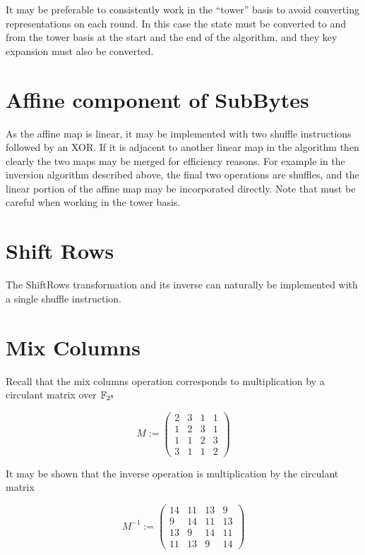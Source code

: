 \documentclass[a4paper]{article}
\numberwithin{equation}{section}
\begin{document}
It may be preferable to consistently work in the ``tower'' basis to avoid converting representations on each round. In this case the state must be converted to and from the tower basis at the start and the end of the algorithm, and they key expansion must also be converted.

\section{Affine component of SubBytes}

As the affine map is linear, it may be implemented with two shuffle instructions followed by an XOR. If it is adjacent to another linear map in the algorithm then clearly the two maps may be merged for efficiency reasons. For example in the inversion algorithm described above, the final two operations are shuffles, and the linear portion of the affine map may be incorporated directly. Note that must be careful when working in the tower basis.

\section{Shift Rows}

The ShiftRows transformation and its inverse can naturally be implemented with a single shuffle instruction.

\section{Mix Columns}

Recall that the mix columns operation corresponds to multiplication by a circulant matrix over $\mathbb{F}_{2^8}$ 

\[ M :=
\left( \begin{array}{cccc}
2 & 3 & 1 & 1 \\
1 & 2 & 3 & 1 \\
1 & 1 & 2 & 3 \\
3 & 1 & 1 & 2
\end{array} \right)
\]

It may be shown that the inverse operation is multiplication by the circulant matrix

\[ M^{-1} := 
\left( \begin{array}{cccc}
14 & 11 & 13 & 9 \\
9 & 14 & 11 & 13 \\
13 & 9 & 14 & 11 \\
11 & 13 & 9 & 14
\end{array} \right)
\]
\end{document}
